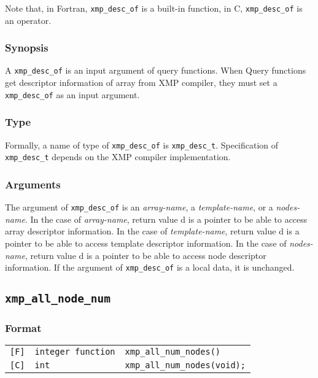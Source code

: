              Note that, in Fortran, {\tt xmp\_desc\_of} is a built-in function,
             in C, {\tt xmp\_desc\_of} is an operator.

\subsubsection*{Synopsis}

    A {\tt xmp\_desc\_of} is an input argument of query functions.
    When Query functions get descriptor information of array
    from XMP compiler, they must set a {\tt xmp\_desc\_of} as an
    input argument.

\subsubsection*{Type}

    Formally, a name of type of {\tt xmp\_desc\_of} is {\tt xmp\_desc\_t}.
    Specification of {\tt xmp\_desc\_t} depends on the XMP compiler implementation.

\subsubsection*{Arguments}

   The argument of {\tt xmp\_desc\_of} is an {\it array-name}, a {\it template-name}, or a {\it nodes-name}.
   In the case of {\it array-name}, return value d is a pointer to
   be able to access array descriptor information.
   In the case of {\it template-name}, return value d is a pointer to
   be able to access template descriptor information.
   In the case of {\it nodes-name}, return value d is a pointer to
   be able to access node descriptor information.
   If the argument of {\tt xmp\_desc\_of} is a local data, it is unchanged.

\vspace{0.3cm}

\subsection{\tt xmp\_all\_node\_num}

\subsubsection*{Format}

\begin{tabular}{lll}

\verb![F]!&  {\tt integer function}& {\tt xmp\_all\_num\_nodes()}\\

\verb![C]!&  {\tt int}& {\tt xmp\_all\_num\_nodes(void);}

\end{tabular}

